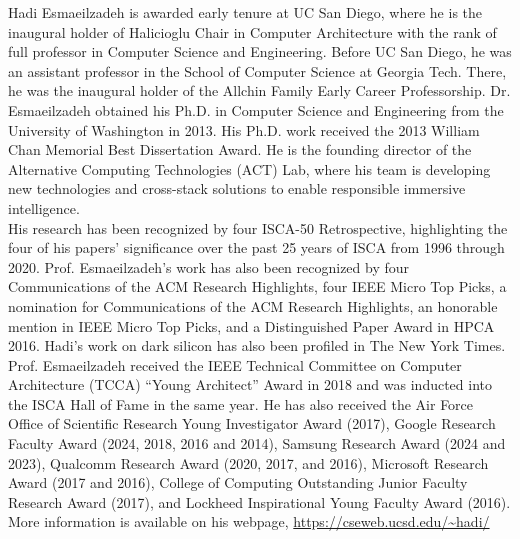 Hadi Esmaeilzadeh is awarded early tenure at UC San Diego, where he is the inaugural holder of Halicioglu Chair in Computer Architecture with the rank of full professor in Computer Science and Engineering. Before UC San Diego, he was an assistant professor in the School of Computer Science at Georgia Tech. There, he was the inaugural holder of the Allchin Family Early Career Professorship. Dr. Esmaeilzadeh obtained his Ph.D. in Computer Science and Engineering from the University of Washington in 2013. His Ph.D. work received the 2013 William Chan Memorial Best Dissertation Award.  He is the founding director of the Alternative Computing Technologies (ACT) Lab, where his team is developing new technologies and cross-stack solutions to enable responsible immersive intelligence.\\
His research has been recognized by four ISCA-50 Retrospective, highlighting the four of his papers’ significance over the past 25 years of ISCA from 1996 through 2020. Prof. Esmaeilzadeh’s work has also been recognized by four Communications of the ACM Research Highlights, four IEEE Micro Top Picks, a nomination for Communications of the ACM Research Highlights, an honorable mention in IEEE Micro Top Picks, and a Distinguished Paper Award in HPCA 2016. Hadi’s work on dark silicon has also been profiled in The New York Times.\\
Prof. Esmaeilzadeh received the IEEE Technical Committee on Computer Architecture (TCCA) “Young Architect” Award in 2018 and was inducted into the ISCA Hall of Fame in the same year.  He has also received the Air Force Office of Scientific Research Young Investigator Award (2017), 
Google Research Faculty Award (2024, 2018, 2016 and 2014), Samsung Research Award (2024 and 2023), Qualcomm Research Award (2020, 2017, and 2016), Microsoft Research Award (2017 and 2016),
College of Computing Outstanding Junior Faculty Research Award (2017), and Lockheed Inspirational Young Faculty Award (2016).
More information is available on his webpage, \url{https://cseweb.ucsd.edu/~hadi/}
